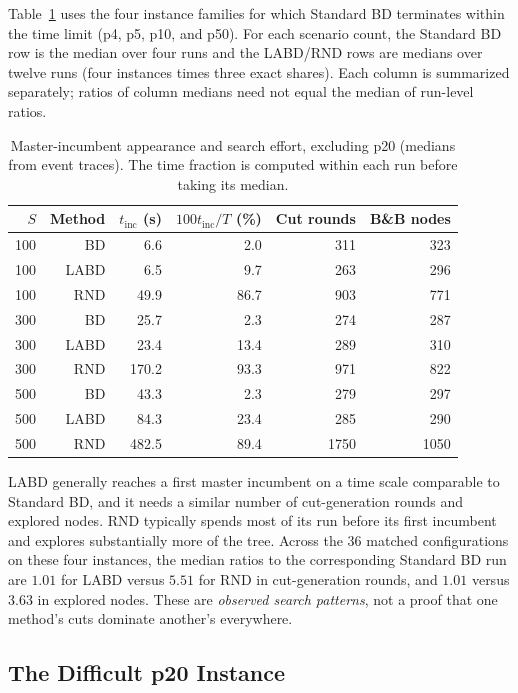 Table~\ref{tab:trace-incumbents} uses the four instance families for which Standard BD terminates within the time limit (p4, p5, p10, and p50). For each scenario count, the Standard BD row is the median over four runs and the LABD/RND rows are medians over twelve runs (four instances times three exact shares). Each column is summarized separately; ratios of column medians need not equal the median of run-level ratios.

\begin{table}[ht]
\centering
\caption{Master-incumbent appearance and search effort, excluding p20 (medians from event traces). The time fraction is computed within each run before taking its median.}
\label{tab:trace-incumbents}
\scriptsize
\setlength{\tabcolsep}{4pt}
\begin{tabular}{rr r r r r}
\toprule
$S$ & Method & $t_{\mathrm{inc}}$ (s) & $100t_{\mathrm{inc}}/T$ (\%) & Cut rounds & B\&B nodes\\
\midrule
100 & BD   & 6.6  & 2.0  & 311 & 323\\
100 & LABD & 6.5  & 9.7  & 263 & 296\\
100 & RND  & 49.9 & 86.7 & 903 & 771\\
\midrule
300 & BD   & 25.7  & 2.3  & 274 & 287\\
300 & LABD & 23.4  & 13.4 & 289 & 310\\
300 & RND  & 170.2 & 93.3 & 971 & 822\\
\midrule
500 & BD   & 43.3  & 2.3  & 279 & 297\\
500 & LABD & 84.3  & 23.4 & 285 & 290\\
500 & RND  & 482.5 & 89.4 & 1750 & 1050\\
\bottomrule
\end{tabular}
\end{table}

LABD generally reaches a first master incumbent on a time scale comparable to Standard BD, and it needs a similar number of cut-generation rounds and explored nodes. RND typically spends most of its run before its first incumbent and explores substantially more of the tree. Across the 36 matched configurations on these four instances, the median ratios to the corresponding Standard BD run are $1.01$ for LABD versus $5.51$ for RND in cut-generation rounds, and $1.01$ versus $3.63$ in explored nodes. These are \emph{observed search patterns}, not a proof that one method's cuts dominate another's everywhere.

\subsection{The Difficult p20 Instance}\label{app:trace-p20}

